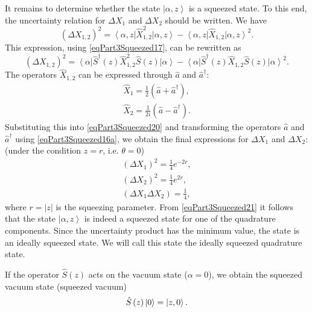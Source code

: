 It remains to determine whether the state $\left|\alpha, z\right>$
is a squeezed state. To this end, the uncertainty relation
for $\Delta X_1$ and $\Delta X_2$ should be written. We have
\begin{equation}
\left(\Delta X_{1,2}\right)^2 = 
\left<\alpha, z\right| \hat{X}_{1,2}^2\left|\alpha, z\right> -
\left<\alpha, z\right| \hat{X}_{1,2}\left|\alpha, z\right>^2.
\nonumber
\end{equation}
This expression, using \eqref{eqPart3Squeezed17}, can be rewritten as
\begin{equation}
\left(\Delta X_{1,2}\right)^2 = 
\left<\alpha\right|\hat{S}^{\dag}\left(z\right) \hat{X}_{1,2}^2\hat{S}\left(z\right)\left|\alpha\right> -
\left<\alpha\right|\hat{S}^{\dag}\left(z\right) \hat{X}_{1,2}\hat{S}\left(z\right)\left|\alpha\right>^2.
\label{eqPart3Squeezed20}
\end{equation}
The operators $\hat{X}_{1,2}$ can be expressed through $\hat{a}$ and $\hat{a}^{\dag}$:
\begin{eqnarray}
\hat{X}_1 = \frac{1}{2}\left(\hat{a} + \hat{a}^{\dag}\right), 
\nonumber \\
\hat{X}_2 = \frac{1}{2 i}\left(\hat{a} - \hat{a}^{\dag}\right).
\nonumber
\end{eqnarray}
Substituting this into \eqref{eqPart3Squeezed20} and transforming the operators
$\hat{a}$ and $\hat{a}^{\dag}$ using \eqref{eqPart3Squeezed16a},
we obtain the final expressions for $\Delta X_1$ and $\Delta X_2$:
(under the condition $z = r$, i.e. $\theta = 0$)
\begin{eqnarray}
\left(\Delta X_1\right)^2 = \frac{1}{4}e^{-2 r},
\nonumber \\
\left(\Delta X_2\right)^2 = \frac{1}{4}e^{2 r},
\nonumber \\
\left(\Delta X_1 \Delta X_2\right) = \frac{1}{4},
\label{eqPart3Squeezed21}
\end{eqnarray}
where $r = \left|z\right|$ is the squeezing parameter. From
\eqref{eqPart3Squeezed21} it follows that the state $\left|\alpha,
z\right>$ is indeed a squeezed state for one of the
quadrature components. Since the uncertainty product has
the minimum value, the state is an ideally squeezed
state. We will call this state the ideally squeezed
quadrature state.

If the operator $\hat{S}\left(z\right)$ acts on the vacuum
state ($\alpha = 0$), we obtain the squeezed vacuum state (squeezed
vacuum)
\begin{equation}
\hat{S}\left(z\right)\ket{0} = \ket{z, 0}.
\nonumber
\end{equation}

